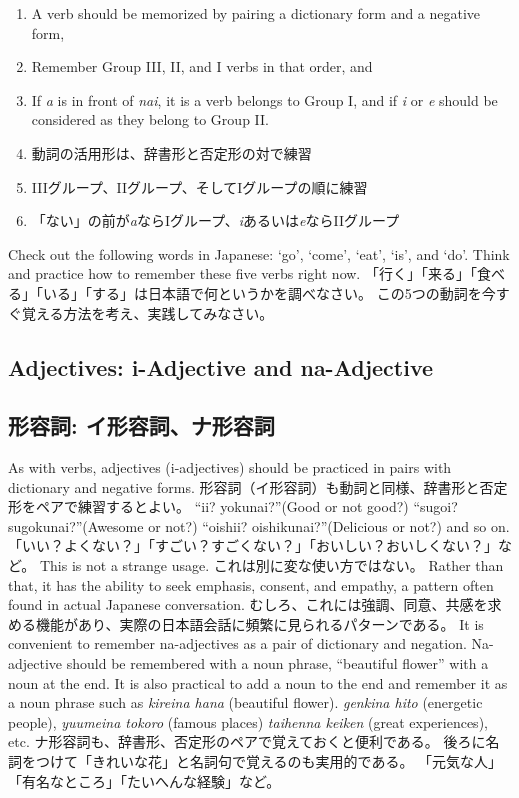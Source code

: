 \documentclass[uplatex,dvipdfmx,b5paper,english,10pt]{jsbook}
\begin{document}
\begin{enumerate}
\ifEnglish
  \item A verb should be memorized by pairing a dictionary form and a negative form,
  \item Remember Group III, II, and I verbs in that order, and
  \item If {\it a\/} is in front of {\it nai\/}, it is a verb belongs to Group I, and if {\it i\/} or {\it e\/} should be considered as they belong to Group II.
\else
  \item 動詞の活用形は、辞書形と否定形の対で練習
  \item IIIグループ、IIグループ、そしてIグループの順に練習
  \item 「ない」の前が{\it a\/}ならIグループ、{\it i\/}あるいは{\it e\/}ならIIグループ
\fi
\end{enumerate}

\begin{toiquestion}
\ifEnglish
Check out the following words in Japanese: `go', `come', `eat', `is', and `do'.
Think and practice how to remember these five verbs right now.
\else
「行く」「来る」「食べる」「いる」「する」は日本語で何というかを調べなさい。
この5つの動詞を今すぐ覚える方法を考え、実践してみなさい。
\fi
\end{toiquestion}

\ifEnglish
\subsection{Adjectives: i-Adjective and na-Adjective}
\else
\subsection{形容詞: イ形容詞、ナ形容詞}
\fi

\ifEnglish
As with verbs, adjectives (i-adjectives) should be practiced in pairs with dictionary and negative forms.
\else
形容詞（イ形容詞）も動詞と同様、辞書形と否定形をペアで練習するとよい。
\fi
\ifEnglish
``ii? yokunai?''(Good or not good?) ``sugoi? sugokunai?''(Awesome or not?)  ``oishii? oishikunai?''(Delicious or not?) and so on.
\else
「いい？よくない？」「すごい？すごくない？」「おいしい？おいしくない？」など。
\fi
\ifEnglish
This is not a strange usage.
\else
これは別に変な使い方ではない。
\fi
\ifEnglish
Rather than that, it has the ability to seek emphasis, consent, and empathy, a pattern often found in actual Japanese conversation.
\else
むしろ、これには強調、同意、共感を求める機能があり、実際の日本語会話に頻繁に見られるパターンである。
\fi
\ifEnglish
It is convenient to remember na-adjectives as a pair of dictionary and negation.
Na-adjective should be remembered with a noun phrase, ``beautiful flower'' with a noun at the end.
It is also practical to add a noun to the end and remember it as a noun phrase such as {\it kireina hana\/} (beautiful flower).
{\it genkina hito\/} (energetic people), {\it yuumeina tokoro\/} (famous places) {\it taihenna keiken\/} (great experiences), etc.
\else
ナ形容詞も、辞書形、否定形のペアで覚えておくと便利である。
後ろに名詞をつけて「きれいな花」と名詞句で覚えるのも実用的である。
「元気な人」「有名なところ」「たいへんな経験」など。
\fi
\end{document}
